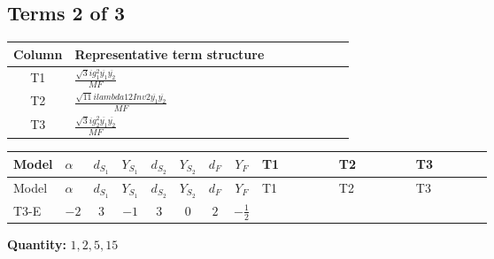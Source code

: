 \documentclass[8pt]{article}
\begin{document}
\begin{landscape}
\subsection*{Terms 2 of 3}
\begin{center}
\begin{tabular}{@{}c >{\raggedright\arraybackslash}p{0.82\linewidth}@{}}
\toprule
Column & Representative term structure \\
\midrule
T1 & \(\displaystyle \frac{\sqrt{3} i g_{1}^{2} \overline{y_{1}} \overline{y_{2}}}{MF}\) \\
\midrule
T2 & \(\displaystyle \frac{\sqrt{11} i lambda12Inv2 \overline{y_{1}} \overline{y_{2}}}{MF}\) \\
\midrule
T3 & \(\displaystyle \frac{\sqrt{3} i g_{2}^{2} \overline{y_{1}} \overline{y_{2}}}{MF}\) \\
\midrule
\bottomrule
\end{tabular}
\end{center}
\smallskip
\tiny
\begin{longtable}{@{}llcccccc >{\raggedright\arraybackslash}p{0.21\linewidth} >{\raggedright\arraybackslash}p{0.21\linewidth} >{\raggedright\arraybackslash}p{0.21\linewidth}@{}}
\toprule
Model & $\alpha$ & $d_{S_1}$ & $Y_{S_1}$ & $d_{S_2}$ & $Y_{S_2}$ & $d_F$ & $Y_F$ & T1 & T2 & T3 \\
\midrule
\endfirsthead
\toprule
Model & $\alpha$ & $d_{S_1}$ & $Y_{S_1}$ & $d_{S_2}$ & $Y_{S_2}$ & $d_F$ & $Y_F$ & T1 & T2 & T3 \\
\midrule
\endhead
T3-E & $-2$ & $3$ & $-1$ & $3$ & $0$ & $2$ & $-\frac{1}{2}$ & \scriptsize\adjustbox{max width=\linewidth}{$\begin{gathered} \frac{\sqrt{3} i g_{1}^{2} \overline{y_{1}} \overline{y_{2}}}{8 MF}\end{gathered}$} & \scriptsize\adjustbox{max width=\linewidth}{$\begin{gathered} \frac{3 \sqrt{11} i lambda12Inv2 \overline{y_{1}} \overline{y_{2}}}{22 MF}\end{gathered}$} & \scriptsize\adjustbox{max width=\linewidth}{$\begin{gathered} \frac{15 \sqrt{3} i g_{2}^{2} \overline{y_{1}} \overline{y_{2}}}{8 MF}\end{gathered}$} \\
\midrule
\bottomrule
\end{longtable}
\clearpage
\noindent\textbf{Quantity: }$\mathrm{1,2,5,15}$\par\smallskip

\end{landscape}
\end{document}
